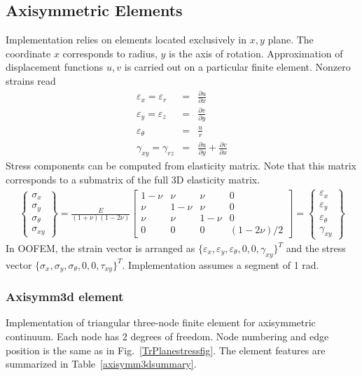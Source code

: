 \documentclass[a4paper]{article}
\begin{document}
\subsection{Axisymmetric Elements}
Implementation relies on elements located exclusively in $x,y$ plane. The coordinate $x$ corresponds to radius, $y$ is the axis of rotation. Approximation of displacement functions $u,v$ is carried out on a particular finite element. Nonzero strains read
\begin{eqnarray}
\varepsilon_{x}=\varepsilon_{r}&=&\frac{\partial u}{\partial x}\\
\varepsilon_{y}=\varepsilon_{z}&=&\frac{\partial v}{\partial y}\\
\varepsilon_{\theta}&=&\frac{u}{r}\\
\gamma_{xy}=\gamma_{rz}&=&\frac{\partial u}{\partial y} + \frac{\partial v}{\partial x}
\end{eqnarray}
Stress components can be computed from elasticity matrix. Note that this matrix corresponds to a submatrix of the full 3D elasticity matrix.
\begin{eqnarray}
\left\{\begin{array}{c} \sigma_x \\ \sigma_y \\ \sigma_\theta \\ \sigma_{xy} \end{array} \right\} = 
\frac{E}{(1+\nu)(1-2\nu)}\left[ \begin{array}{cccc} 1-\nu & \nu & \nu & 0 \\ \nu & 1-\nu & \nu & 0 \\ \nu & \nu & 1-\nu & 0 \\ 0 & 0 & 0 & (1-2\nu)/2 \end{array} \right] = 
\left\{\begin{array}{c} \varepsilon_x \\ \varepsilon_y \\ \varepsilon_\theta \\ \gamma_{xy} \end{array} \right\} 
\end{eqnarray}
In OOFEM, the strain vector is arranged as $\{\varepsilon_{x}, \varepsilon_{y}, \varepsilon_{\theta}, 0, 0, \gamma_{xy}\}^T$ and the stress vector $\{\sigma_{x}, \sigma_{y}, \sigma_{\theta}, 0, 0, \tau_{xy}\}^T$. Implementation assumes a segment of 1 rad.

\subsubsection{Axisymm3d element}
Implementation of triangular three-node finite element 
for axisymmetric continuum. Each node has 2 degrees of freedom. 
Node numbering and edge position is the same as in Fig.~\ref{TrPlanestressfig}. 
The element features are summarized in Table~\ref{axisymm3dsummary}. 
\end{document}
